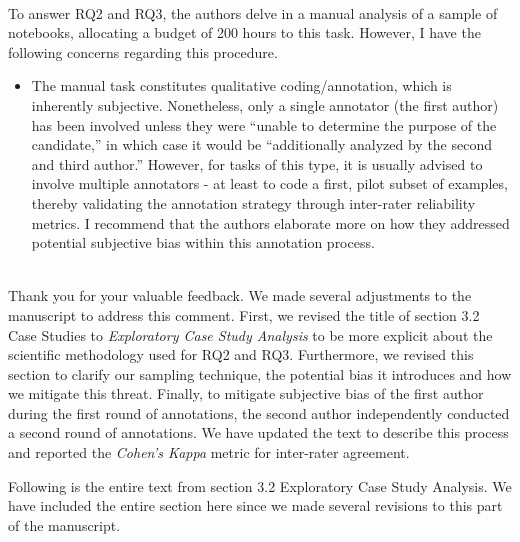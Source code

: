 \documentclass[11pt,fleqn]{article}
\newcommand{\eline}{\vspace*{.75\baselineskip}}
\newcommand{\Referee}[1]{\eline \noindent {\bf Reviewer comment #1:} \\}
\newcommand{\Us}{\eline \noindent {\bf Response:}\\}
\newenvironment{revcomment}[1][]
{\Referee{#1}\begin{rcomment}}
{\end{rcomment}}
\begin{document}
\begin{revcomment}[1.5]
  To answer RQ2 and RQ3, the authors delve in a manual analysis of a sample of notebooks, allocating a budget of 200 hours to this task. However, I have the following concerns regarding this procedure.

  \begin{itemize}
    \item The manual task constitutes qualitative coding/annotation, which is inherently subjective. Nonetheless, only a single annotator (the first author) has been involved unless they were ``unable to determine the purpose of the candidate,'' in which case it would be ``additionally analyzed by the second and third author.'' However, for tasks of this type, it is usually advised to involve multiple annotators - at least to code a first, pilot subset of examples, thereby validating the annotation strategy through inter-rater reliability metrics. I recommend that the authors elaborate more on how they addressed potential subjective bias within this annotation process.
  \end{itemize}
\end{revcomment}

\Us Thank you for your valuable feedback. We made several adjustments to the manuscript to address this comment. First, we revised the title of section 3.2 Case Studies to \emph{Exploratory Case Study Analysis} to be more explicit about the scientific methodology used for RQ2 and RQ3. Furthermore, we revised this section to clarify our sampling technique, the potential bias it introduces and how we mitigate this threat. Finally, to mitigate subjective bias of the first author during the first round of annotations, the second author independently conducted a second round of annotations. We have updated the text to describe this process and reported the \emph{Cohen's Kappa} metric for inter-rater agreement.

Following is the entire text from section 3.2 Exploratory Case Study Analysis. We have included the entire section here since we made several revisions to this part of the manuscript.
\end{document}
